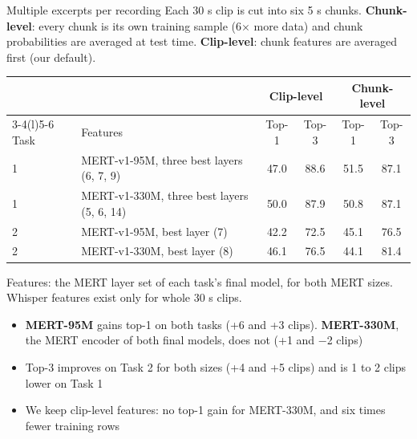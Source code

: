 \documentclass[aspectratio=169,11pt]{beamer}
\newenvironment{tight}{\begin{itemize}\setlength{\itemsep}{1.5pt}\setlength{\parskip}{0pt}\setlength{\topsep}{0pt}}{\end{itemize}}
\begin{document}
\begin{frame}[t]{Multiple excerpts per recording}
  \small
  Each 30 s clip is cut into six 5 s chunks. \textbf{Chunk-level}: every chunk is its own training sample (6$\times$ more data) and chunk probabilities are averaged at test time.
  \textbf{Clip-level}: chunk features are averaged first (our default).
  \vspace{0.1em}

  \centering
  {\footnotesize
  \begin{tabular}{@{}llcccc@{}}
    \toprule
    & & \multicolumn{2}{c}{Clip-level} & \multicolumn{2}{c}{Chunk-level} \\ \cmidrule(lr){3-4}\cmidrule(l){5-6}
    Task & Features & Top-1 & Top-3 & Top-1 & Top-3 \\ \midrule
    1 & MERT-v1-95M, three best layers (6, 7, 9)   & 47.0 & 88.6 & 51.5 & 87.1 \\
    1 & MERT-v1-330M, three best layers (5, 6, 14) & 50.0 & 87.9 & 50.8 & 87.1 \\
    2 & MERT-v1-95M, best layer (7)                & 42.2 & 72.5 & 45.1 & 76.5 \\
    2 & MERT-v1-330M, best layer (8)               & 46.1 & 76.5 & 44.1 & 81.4 \\
    \bottomrule
  \end{tabular}}

  \raggedright
  {\scriptsize\color{gray}Features: the MERT layer set of each task's final model, for both MERT sizes. Whisper features exist only for whole 30 s clips.\par}
  \begin{tight}\footnotesize
    \item \textbf{MERT-95M} gains top-1 on both tasks (+6 and +3 clips). \textbf{MERT-330M}, the MERT encoder of both final models, does not (+1 and $-$2 clips)
    \item Top-3 improves on Task 2 for both sizes (+4 and +5 clips) and is 1 to 2 clips lower on Task 1
    \item We keep clip-level features: no top-1 gain for MERT-330M, and six times fewer training rows
  \end{tight}
\end{frame}
\end{document}
